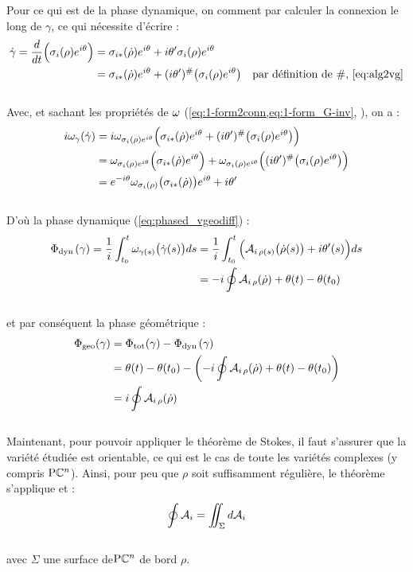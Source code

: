 Pour ce qui est de la phase dynamique, on comment par calculer la connexion le long de $\gamma$, ce qui nécessite d'écrire :
\begin{align*}
	\dot{\gamma} = \frac{d}{dt} \Big( \sigma_i(\rho) e^{i\theta} \Big) &=  \sigma_{i*}(\dot{\rho}) e^{i\theta} + i\theta' \sigma_i(\rho) e^{i\theta} \\
	&= \sigma_{i*}(\dot{\rho}) e^{i\theta} + (i\theta')^\#\big(\sigma_i(\rho) e^{i\theta}\big)  & \text{par définition de $\#$, \cref{eq:alg2vg}}
\end{align*}
\\
Avec, et sachant les propriétés de $\omega$ (\cref{eq:1-form2conn,eq:1-form_G-inv}, ), on a :
\begin{align*}
	i\omega_\gamma(\dot{\gamma}) &= i\omega_{\sigma_i(\rho) e^{i\theta}} \Big( \sigma_{i*}(\dot{\rho}) e^{i\theta} + (i\theta')^\#\big(\sigma_i(\rho) e^{i\theta}\big) \Big) \\
	&= \omega_{\sigma_i(\rho) e^{i\theta}} \Big( \sigma_{i*}(\dot{\rho}) e^{i\theta} \Big) + \omega_{\sigma_i(\rho) e^{i\theta}} \Big((i\theta')^\#\big(\sigma_i(\rho) e^{i\theta}\big) \Big) \\
	&= e^{-i\theta} \omega_{\sigma_i(\rho)} \big( \sigma_{i*}(\dot{\rho}) \big) e^{i\theta} + i\theta'
\end{align*}
\\
D'où la phase dynamique (\cref{eq:phased_vgeodiff}) :
\begin{align*}
	\Phi_{\text{\normalfont dyn}\, }(\gamma) = \frac{1}{i}\int_{t_0}^t \omega_{\gamma(s)} \big( \dot{\gamma}(s) \big)ds 
	&= \frac{1}{i}\int_{t_0}^t \Big( \mathcal{A}_{i\, \rho(s)}\big(\dot{\rho}(s) \big) + i\theta'(s)\Big)ds \\
	&= -i \oint \mathcal{A}_{i\, \rho} (\dot{\rho}) + \theta(t) - \theta(t_0)
\end{align*}
\\
et par conséquent la phase géométrique :
\begin{align*}
	\Phi_{\text{\normalfont geo}}(\gamma) &= \Phi_{\text{\normalfont tot}}(\gamma) - \Phi_{\text{\normalfont dyn}\, }(\gamma) \\
	&= \theta(t) - \theta(t_0) - \left( -i \oint \mathcal{A}_{i\, \rho} (\dot{\rho}) + \theta(t) - \theta(t_0) \right) \\
	&= i \oint \mathcal{A}_{i\, \rho} (\dot{\rho})
\end{align*}
\\

Maintenant, pour pouvoir appliquer le théorème de Stokes, il faut s'assurer que la variété étudiée est orientable, ce qui est le cas de toute les variétés complexes \cite[sec. 8.4.2]{nakahara_geometry_2003} (y compris $\text{\normalfont P}\mathbb{C}^{n}$). Ainsi, pour peu que $\rho$ soit suffisamment régulière, le théorème s'applique et :
\[\oint \mathcal{A}_{i}  = \iint_\Sigma d\mathcal{A}_i\]
\\
avec $\Sigma$ une surface de$\text{\normalfont P}\mathbb{C}^{n}$ de bord $\rho$.
\\



